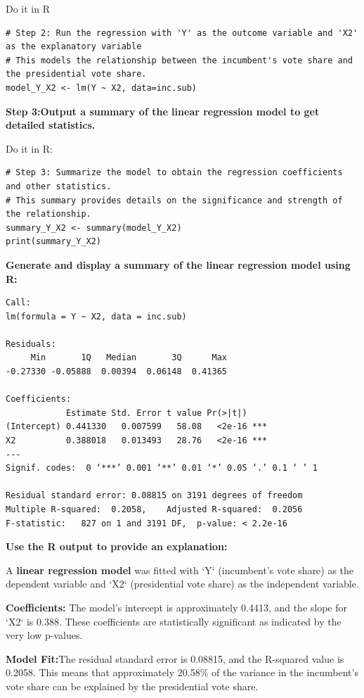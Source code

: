 \documentclass[12pt]{article}
\begin{document}
Do it in R
\begin{lstlisting}
# Step 2: Run the regression with 'Y' as the outcome variable and 'X2' as the explanatory variable
# This models the relationship between the incumbent's vote share and the presidential vote share.
model_Y_X2 <- lm(Y ~ X2, data=inc.sub)

\end{lstlisting}
\textbf{Step 3:Output a summary of the linear regression model to get detailed statistics.}

Do it in R:
\begin{lstlisting}
# Step 3: Summarize the model to obtain the regression coefficients and other statistics.
# This summary provides details on the significance and strength of the relationship.
summary_Y_X2 <- summary(model_Y_X2)
print(summary_Y_X2) 
\end{lstlisting}
\textbf{Generate and display a summary of the linear regression model using R:}

\begin{center}
\begin{BVerbatim}
Call:
lm(formula = Y ~ X2, data = inc.sub)

Residuals:
     Min       1Q   Median       3Q      Max 
-0.27330 -0.05888  0.00394  0.06148  0.41365 

Coefficients:
            Estimate Std. Error t value Pr(>|t|)    
(Intercept) 0.441330   0.007599   58.08   <2e-16 ***
X2          0.388018   0.013493   28.76   <2e-16 ***
---
Signif. codes:  0 ‘***’ 0.001 ‘**’ 0.01 ‘*’ 0.05 ‘.’ 0.1 ‘ ’ 1

Residual standard error: 0.08815 on 3191 degrees of freedom
Multiple R-squared:  0.2058,	Adjusted R-squared:  0.2056 
F-statistic:   827 on 1 and 3191 DF,  p-value: < 2.2e-16
\end{BVerbatim}
\end{center}


\textbf{Use the R output to provide an explanation:}

A \textbf{linear regression model} was fitted with `Y` (incumbent's vote share) as the dependent variable and `X2` (presidential vote share) as the independent variable.

\textbf{Coefficients:} The model's intercept is approximately 0.4413, and the slope for `X2` is 0.388. These coefficients are statistically significant as indicated by the very low p-values.

\textbf{Model Fit:}The residual standard error is 0.08815, and the R-squared value is 0.2058. This means that approximately 20.58\% of the variance in the incumbent's vote share can be explained by the presidential vote share.
\end{document}
